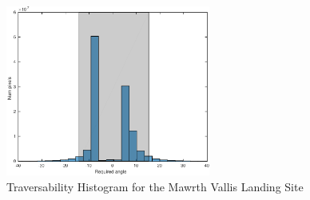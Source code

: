 \documentclass[12pt]{article}
\begin{document}
\begin{figure}[h!]
  \centering
  \includegraphics[width=0.6\textwidth]{figures/maps/ESP_019757_1560/DTEEC_019757_1560_020034_1560_U01-hist.pdf}
  \caption{Traversability Histogram for the Mawrth Vallis Landing Site}
  \label{fig:eberswalde_hist}
\end{figure}
\end{document}
